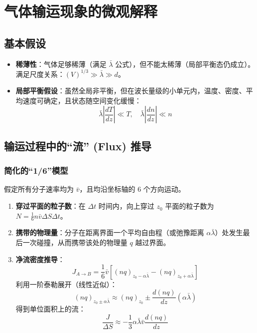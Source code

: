 \documentclass{article}
\begin{document}
\section{气体输运现象的微观解释}

\subsection{基本假设}
\begin{itemize}
    \item \textbf{稀薄性}：气体足够稀薄（满足 $\bar{\lambda}$ 公式），但不能太稀薄（局部平衡态仍成立）。满足尺度关系：$(V)^{1/3} \gg \bar{\lambda} \gg d$。
    \item \textbf{局部平衡假设}：虽然全局非平衡，但在波长量级的小单元内，温度、密度、平均速度可确定，且状态随空间变化缓慢：
    \[ \bar{\lambda} \left| \frac{dT}{dz} \right| \ll T, \quad \bar{\lambda} \left| \frac{dn}{dz} \right| \ll n \]
\end{itemize}

\subsection{输运过程中的“流” (Flux) 推导}
\subsubsection{简化的“1/6”模型}
假定所有分子速率均为 $\bar{v}$，且均沿坐标轴的 6 个方向运动。
\begin{enumerate}
    \item \textbf{穿过平面的粒子数}：在 $\Delta t$ 时间内，向上穿过 $z_0$ 平面的粒子数为 $N = \frac{1}{6} n \bar{v} \Delta S \Delta t$。
    \item \textbf{携带的物理量}：分子在距离界面一个平均自由程（或弛豫距离 $\alpha \bar{\lambda}$）处发生最后一次碰撞，从而携带该处的物理量 $q$ 越过界面。
    \item \textbf{净流密度推导}：
    \[ J_{A \to B} = \frac{1}{6} \bar{v} [ (nq)_{z_0 - \alpha\bar{\lambda}} - (nq)_{z_0 + \alpha\bar{\lambda}} ] \]
    利用一阶泰勒展开（线性近似）：
    \[ (nq)_{z_0 \pm \alpha\bar{\lambda}} \approx (nq)_{z_0} \pm \frac{d(nq)}{dz} (\alpha\bar{\lambda}) \]
    得到单位面积上的流：
    \[ \frac{J}{\Delta S} \approx -\frac{1}{3} \alpha \bar{\lambda} \bar{v} \frac{d(nq)}{dz} \]
\end{enumerate}
\end{document}

